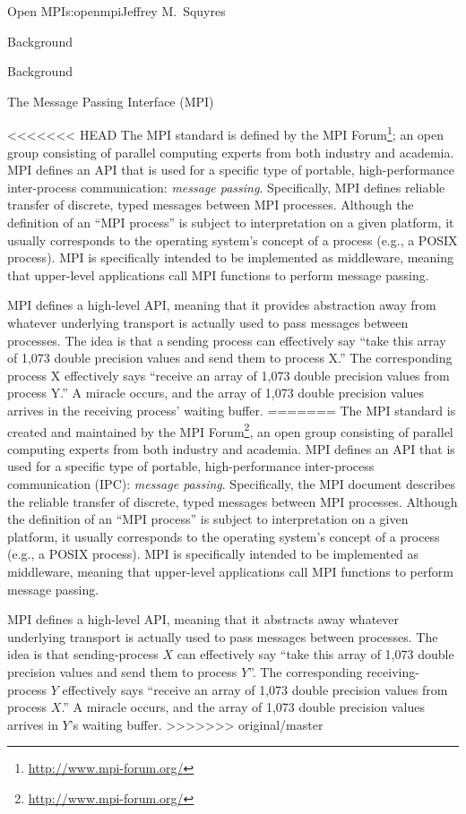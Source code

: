 \begin{aosachapter}{Open MPI}{s:openmpi}{Jeffrey M.\ Squyres}
\begin{aosasect1}{Background}
\begin{aosasect1}{Background}

\begin{aosasect2}{The Message Passing Interface (MPI)}

<<<<<<< HEAD
The MPI standard is defined by the MPI
Forum\footnote{\url{http://www.mpi-forum.org/}}; an open group
consisting of parallel computing experts from both industry and
academia.
%
MPI defines an API that is used for a specific type of portable,
high-performance inter-process communication: {\em message passing}.
Specifically, MPI defines reliable transfer of discrete, typed
messages between MPI processes.  
%
Although the definition of an ``MPI process'' is subject to
interpretation on a given platform, it usually corresponds to the
operating system's concept of a process (e.g., a POSIX process).
%
MPI is specifically intended to be implemented as middleware, meaning
that upper-level applications call MPI functions to perform message
passing.

MPI defines a high-level API, meaning that it provides abstraction
away from whatever underlying transport is actually used to pass
messages between processes.  The idea is that a sending process can
effectively say ``take this array of 1,073 double precision values and
send them to process X.''  The corresponding process X effectively
says ``receive an array of 1,073 double precision values from process
Y.''  A miracle occurs, and the array of 1,073 double precision values
arrives in the receiving process' waiting buffer.
=======
The MPI standard is created and maintained by the MPI
Forum\footnote{\url{http://www.mpi-forum.org/}}, an open group
consisting of parallel computing experts from both industry and
academia.  MPI defines an API that is used for a specific type of
portable, high-performance inter-process communication (IPC):
\emph{message passing}.  Specifically, the MPI document describes the
reliable transfer of discrete, typed messages between MPI processes.
Although the definition of an ``MPI process'' is subject to
interpretation on a given platform, it usually corresponds to the
operating system's concept of a process (e.g., a POSIX process).  MPI
is specifically intended to be implemented as middleware, meaning that
upper-level applications call MPI functions to perform message
passing.

MPI defines a high-level API, meaning that it abstracts away whatever
underlying transport is actually used to pass messages between
processes.  The idea is that sending-process $X$ can effectively say
``take this array of 1,073 double precision values and send them to
process $Y$''.  The corresponding receiving-process $Y$ effectively
says ``receive an array of 1,073 double precision values from process
$X$.''  A miracle occurs, and the array of 1,073 double precision
values arrives in $Y$'s waiting buffer.
>>>>>>> original/master


\end{aosasect2}
\end{aosasect1}
\end{aosasect1}
\end{aosachapter}
